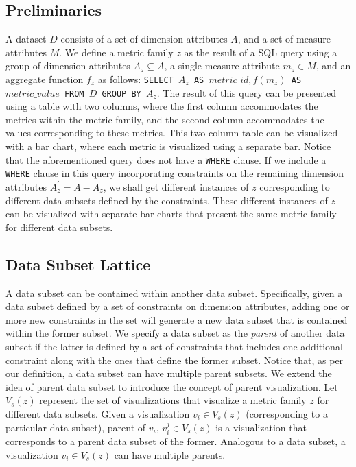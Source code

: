 \subsection{Preliminaries} 
A dataset $D$ consists of a set of dimension attributes $A$, and a set of measure attributes $M$. We define a metric family $z$ as the result of a SQL query using a group of dimension attributes $A_z \subseteq A$, a single measure attribute $m_z \in M$, and an aggregate function $f_z$ as follows: {\tt SELECT $A_z$ AS $metric\_id, f(m_z)$ AS $metric\_value$ FROM $D$ GROUP BY $A_z$}. The result of this query can be presented using a table with two columns, where the first column accommodates the metrics within the metric family, and the second column accommodates the values corresponding to these metrics. This two column table can be visualized with a bar chart, where each metric is visualized using a separate bar. 
\newline
\newline
Notice that the aforementioned query does not have a {\tt WHERE} clause. If we include a {\tt WHERE} clause in this query incorporating constraints on the remaining dimension attributes $A_z^\prime = A - A_z$, we shall get different instances of $z$ corresponding to different data subsets defined by the constraints. These different instances of $z$ can be visualized with separate bar charts that present the same metric family for different data subsets. 

\subsection{Data Subset Lattice}
A data subset can be contained within another data subset. Specifically, given a data subset defined by a set of constraints on dimension attributes, adding one or more new constraints in the set will generate a new data subset that is contained within the former subset. We specify a data subset as the \emph{parent} of another data subset if the latter is defined by a set of constraints that includes one additional constraint along with the ones that define the former subset. Notice that, as per our definition, a data subset can have multiple parent subsets.
 \newline
 \newline
We extend the idea of parent data subset to introduce the concept of parent visualization. Let $V_s(z)$ represent the set of visualizations that visualize a metric family $z$ for different data subsets. Given a visualization $v_i \in V_s(z)$ (corresponding to a particular data subset), parent of $v_i$, $v_i^j \in V_s(z)$ is a visualization that corresponds to a parent data subset of the former. Analogous to a data subset, a visualization $v_i \in V_s(z)$ can have multiple parents. 

